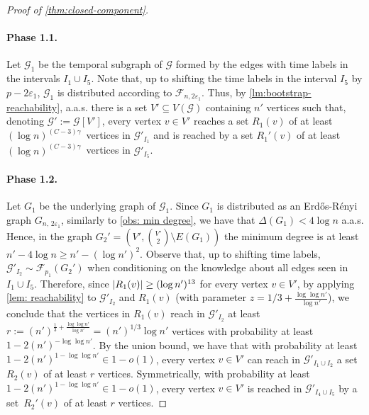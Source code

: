 \documentclass[a4paper,11pt]{article}
\makeatletter
\theoremstyle{definition}
\theoremstyle{plain}
\let\eps\varepsilon
\newcommand{\G}{\mathcal G}
\newcommand{\F}{\mathcal F}
\newcommand{\aas}{a.a.s.\@\xspace}
\DeclarePairedDelimiter{\abs}{\lvert}{\rvert}
\newcommand{\Erdos}{Erd\H{o}s}
\newcommand{\Renyi}{R\'enyi}
\newcommand{\ER}{\Erdos-\Renyi}
\makeatother
\begin{document}
\begin{proof}[Proof of \cref{thm:closed-component}]
	
	\paragraph*{Phase 1.1.}
	Let $\G_1$ be the temporal subgraph of $\G$ formed by the edges with time labels in the intervals $I_1 \cup I_5$. Note that, up to shifting the time labels in the interval $I_5$ by
	$p - 2\eps_1$, $\G_1$ is distributed according to $\F_{n, 2\eps_1}$.
	Thus, by \cref{lm:bootstrap-reachability}, \aas there is a set $V' \subseteq V(\G)$ containing
	$n'$ vertices such that, denoting $\G' := \G[V']$, every vertex $v \in V'$ 
	reaches a set $R_1(v)$ of at least $(\log n)^{(C-3)\gamma}$~vertices in $\G'_{I_1}$ and
	is reached by a set $R_1'(v)$ of at least $(\log n)^{(C-3)\gamma}$~vertices in $\G'_{I_5}$.
	
	\paragraph*{Phase 1.2.}
	Let $G_1$ be the underlying graph of $\G_1$. 
	Since $G_1$ is distributed as an \ER{} graph $G_{n,\,2\eps_1}$,
	similarly to \cref{obs: min degree}, we have that $\Delta(G_1) < 4 \log n$ a.a.s.
	Hence, in the graph $G_2' = \left(V', {V' \choose 2} \setminus E(G_1) \right)$ the minimum degree is at least $n' - 4 \log n \geq n' - (\log n')^2$.
	Observe that, up to shifting time labels, $\G'_{I_2} \sim \F_{p_1}(G_2')$ when conditioning on the knowledge about all edges seen in $I_1 \cup I_5$.
	Therefore, since $\abs{R_1(v)} \geq (\log n')^{13}$ for every vertex $v \in V'$, by applying
	\cref{lem: reachability} to $\G'_{I_2}$ and $R_1(v)$ 
	(with parameter $z = 1/3 + \frac{\log \log n'}{\log n'}$), we conclude that
	the vertices in $R_1(v)$ reach in $\G'_{I_2}$ at least $r := {(n')}^{\frac{1}{3} + \frac{\log\log n'}{\log n'}} = (n')^{1/3} \log n'$ vertices with probability at least $1-2(n')^{-\log\log n'}$.
	By the union bound, we have that with probability at least $1-2(n')^{1-\log\log n'} \in 1-o(1)$, every vertex $v \in V'$ can reach in $\G'_{I_1 \cup I_2}$ a set $R_2(v)$ of at least $r$ vertices.
	Symmetrically, with probability at least $1-2(n')^{1-\log\log n'} \in 1-o(1)$, every vertex $v \in V'$ is reached in $\G'_{I_4 \cup I_5}$ by a set~$R_2'(v)$ of at least $r$ vertices.
	

\end{proof}
\end{document}
